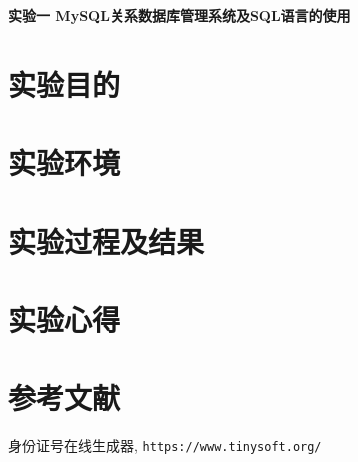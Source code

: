 \documentclass{ML}
\begin{document}
\maketitle

\newpage

\begin{center}
    \textbf{ 实验一 MySQL关系数据库管理系统及SQL语言的使用}
\end{center}

\section{实验目的}

\section{实验环境}

\section{实验过程及结果}

\section{实验心得}


\section{参考文献}
\begin{thebibliography}{20}
     身份证号在线生成器, \texttt{https://www.tinysoft.org/}
\end{thebibliography}
\end{document}
